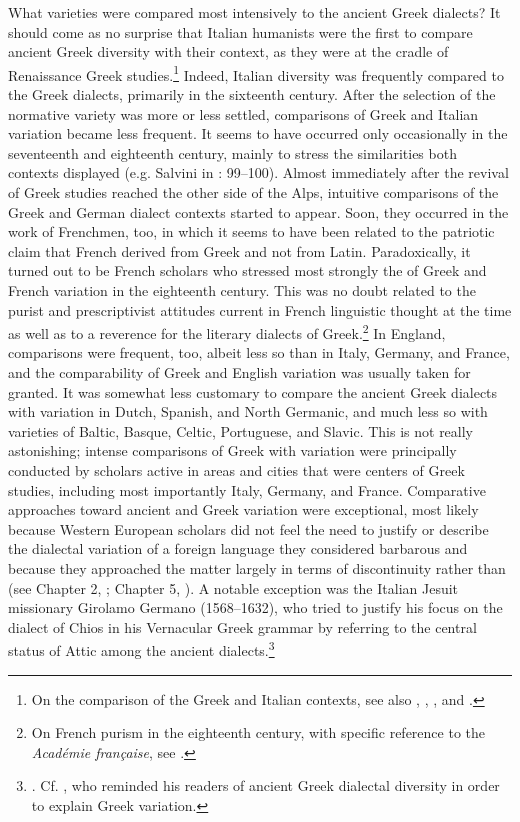 What  varieties were compared most intensively to the ancient Greek dialects? It should come as no surprise that Italian humanists were the first to compare ancient Greek diversity with their  context, as they were at the cradle of Renaissance Greek studies.\footnote{On the comparison of the Greek and Italian contexts, see also \citet[2–3, 51]{Dionisotti1968}, \citet[179]{Alinei1984}, \citet[215]{Trovato1984}, and \citet[36--37]{Lepschy2002}.} Indeed, Italian diversity was frequently compared to the Greek dialects, primarily in the sixteenth century. After the selection of the normative variety was more or less settled, comparisons of Greek and Italian variation became less frequent. It seems to have occurred only occasionally in the seventeenth and eighteenth century, mainly to stress the similarities both contexts displayed (e.g. Salvini in \citealt{Muratori1724}: 99–100). Almost immediately after the revival of Greek studies reached the other side of the Alps, intuitive comparisons of the Greek and German dialect contexts started to appear. Soon, they occurred in the work of Frenchmen, too, in which it seems to have been related to the patriotic claim that French derived from Greek and not from Latin. Paradoxically, it turned out to be French scholars who stressed most strongly the  of Greek and French variation in the eighteenth century. This was no doubt related to the purist and prescriptivist attitudes current in French linguistic thought at the time as well as to a reverence for the literary dialects of Greek.\footnote{On French purism in the eighteenth century, with specific reference to the \textit{Académie française}, see \citet[]{Francois1905}.} In England, comparisons were frequent, too, albeit less so than in Italy, Germany, and France, and the comparability of Greek and English variation was usually taken for granted. It was somewhat less customary to compare the ancient Greek dialects with variation in Dutch, Spanish, and North Germanic, and much less so with varieties of Baltic, Basque, Celtic, Portuguese, and Slavic. This is not really astonishing; intense comparisons of Greek with  variation were principally conducted by scholars active in areas and cities that were centers of Greek studies, including most importantly Italy, Germany, and France. Comparative approaches toward ancient and  Greek variation were exceptional, most likely because Western European scholars did not feel the need to justify or describe the dialectal variation of a foreign language they considered barbarous and because they approached the matter largely in terms of discontinuity rather than  (see Chapter 2, ; Chapter 5, ). A notable exception was the Italian Jesuit missionary Girolamo Germano (1568–1632), who tried to justify his focus on the dialect of Chios in his Vernacular Greek grammar by referring to the central status of Attic among the ancient dialects.\footnote{\citet[10]{Germano1622}. Cf. \citet[vi-vii]{Du1688}, who reminded his readers of ancient Greek dialectal diversity in order to explain  Greek variation.}

